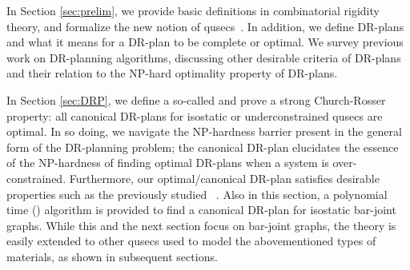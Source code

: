 In Section \ref{sec:prelim}, we provide basic definitions in combinatorial rigidity theory,  and formalize the new notion of qusecs~\cite{sitharam2010optimized,sitharam2006well,sitharam2010reconciling}.
In addition, we define DR-plans and what it means for a DR-plan to be complete or optimal. We survey previous work on DR-planning algorithms, discussing other desirable criteria of DR-plans and their relation to the NP-hard optimality property of DR-plans.



In Section \ref{sec:DRP}, we define a so-called  and prove a strong Church-Rosser property: all canonical DR-plans for isostatic or underconstrained qusecs are optimal. In so doing, we navigate the NP-hardness barrier present in the general form of the DR-planning problem; the canonical DR-plan elucidates the essence of the NP-hardness of finding optimal DR-plans when a system is over-constrained. Furthermore, our optimal/canonical DR-plan satisfies desirable properties such as the previously studied ~\cite{hoffman2001decompositionI}. Also in this section, a polynomial time (\ComplexityCanDRP) algorithm is provided to find a canonical DR-plan for isostatic bar-joint graphs.  While this and the next section focus on bar-joint graphs, the theory is easily extended to other qusecs used to model the abovementioned types of materials, as shown in subsequent sections.


